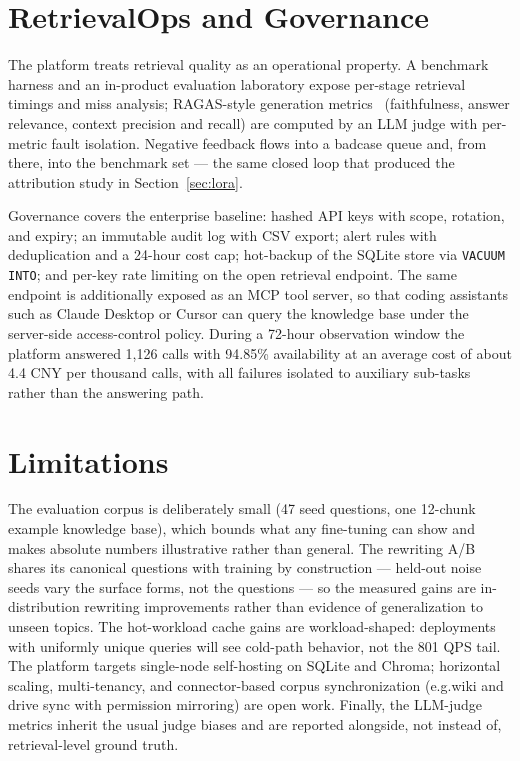 \documentclass[11pt,a4paper]{article}
\newcommand{\eg}{e.g.}
\begin{document}
\section{RetrievalOps and Governance}\label{sec:governance}

The platform treats retrieval quality as an operational property. A benchmark harness
and an in-product evaluation laboratory expose per-stage retrieval timings and miss
analysis; RAGAS-style generation metrics~\citep{es2024ragas} (faithfulness, answer
relevance, context precision and recall) are computed by an LLM judge with per-metric
fault isolation. Negative feedback flows into a badcase queue and, from there, into the
benchmark set --- the same closed loop that produced the attribution study in
Section~\ref{sec:lora}.

Governance covers the enterprise baseline: hashed API keys with scope, rotation, and
expiry; an immutable audit log with CSV export; alert rules with deduplication and a
24-hour cost cap; hot-backup of the SQLite store via \texttt{VACUUM INTO}; and per-key
rate limiting on the open retrieval endpoint. The same endpoint is additionally exposed
as an MCP tool server, so that coding assistants such as Claude Desktop or Cursor can
query the knowledge base under the server-side access-control policy. During a 72-hour
observation window the platform answered 1{,}126 calls with 94.85\% availability at an
average cost of about 4.4 CNY per thousand calls, with all failures isolated to
auxiliary sub-tasks rather than the answering path.

\section{Limitations}\label{sec:limitations}

The evaluation corpus is deliberately small (47 seed questions, one 12-chunk example
knowledge base), which bounds what any fine-tuning can show and makes absolute numbers
illustrative rather than general. The rewriting A/B shares its canonical questions with
training by construction --- held-out noise seeds vary the surface forms, not the
questions --- so the measured gains are in-distribution rewriting improvements rather
than evidence of generalization to unseen topics. The hot-workload cache gains are
workload-shaped: deployments with uniformly unique queries will see cold-path behavior,
not the 801 QPS tail. The platform targets single-node self-hosting on SQLite and
Chroma; horizontal scaling, multi-tenancy, and connector-based corpus synchronization
(\eg wiki and drive sync with permission mirroring) are open work. Finally, the
LLM-judge metrics inherit the usual judge biases and are reported alongside, not
instead of, retrieval-level ground truth.
\end{document}
